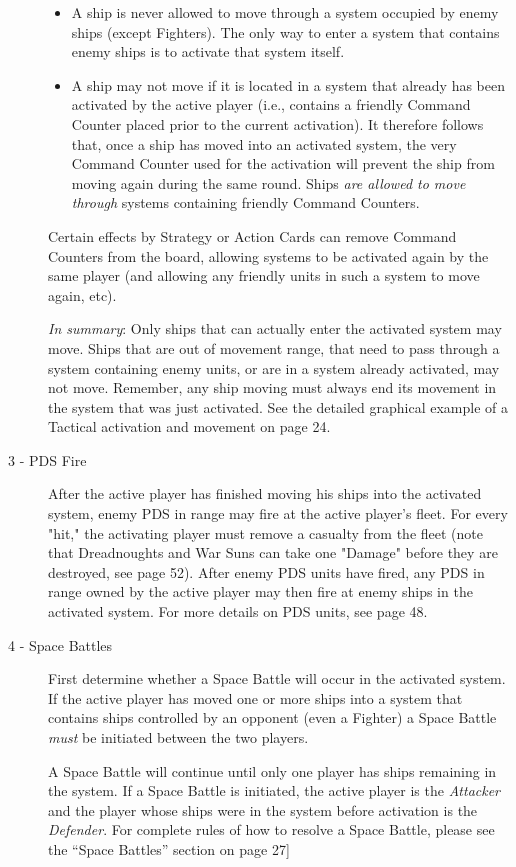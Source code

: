\documentclass[11pt,fleqn]{book} %
\begin{document}
\begin{description}
\begin{itemize}
    \item A ship is never allowed to move through a system occupied by enemy ships (except Fighters). The only way to enter a system that contains enemy ships is to activate that system itself.

    \item A ship may not move if it is located in a system that already has been activated by the active player (i.e., contains a friendly Command Counter placed prior to the current activation). It therefore follows that, once a ship has moved into an activated system, the very Command Counter used for the activation will prevent the ship from moving again during the same round. Ships \emph{are allowed to move through} systems containing friendly Command Counters.
\end{itemize}
Certain effects by Strategy or Action Cards can remove Command Counters from the board, allowing systems to be activated again by the same player (and allowing any friendly units in such a system to move again, etc).

\emph{In summary}: Only ships that can actually enter the activated system may move. 
Ships that are out of movement range, that need to pass through a system containing enemy units, or are in a system already activated, may not move. Remember, any ship moving must always end its movement in the system that was just activated. See the detailed graphical example of a Tactical activation and movement on page 24.


\item[3 - PDS Fire]
After the active player has finished moving his ships into the activated system, enemy PDS in range may fire at the active player's fleet. For every "hit," the activating player must remove a casualty from the fleet (note that Dreadnoughts and War Suns can take one "Damage" before they are destroyed, see page 52). After enemy PDS units have fired, any PDS in range owned by the active player may then fire at enemy ships in the activated system. For more details on PDS units, see page 48.

\item[4 - Space Battles]
First determine whether a Space Battle will occur in the activated system.
If the active player has moved one or more ships into a system that contains ships controlled by an opponent (even a Fighter) a Space Battle \emph{must} be initiated between the two players.

A Space Battle will continue until only one player has ships remaining in the system. If a Space Battle is initiated, the active player is the \emph{Attacker} and the player whose ships were in the system before activation is the \emph{Defender}.  For complete rules of how to resolve a Space Battle, please see the “Space Battles” section on page 27]


\end{description}
\end{document}
